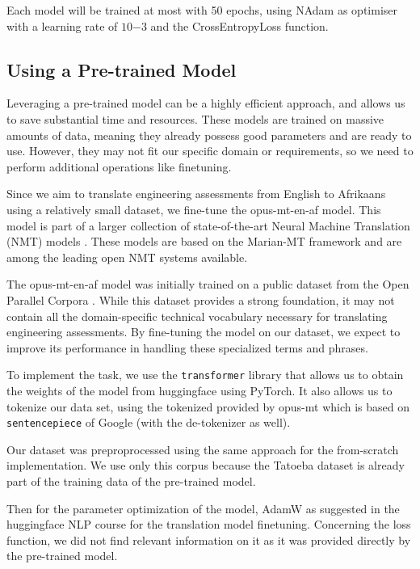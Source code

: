Each model will be trained at most with 50 epochs, using NAdam as optimiser with a learning rate of $10{-3}$ and the CrossEntropyLoss function. 


\subsection{Using a Pre-trained Model}
Leveraging a pre-trained model can be a highly efficient approach, and allows us to save substantial time and resources. These models are trained on massive amounts of data, meaning they already possess good parameters and are ready to use. However, they may not fit our specific domain or requirements, so we need to perform additional operations like finetuning. 

Since we aim to translate engineering assessments from English to Afrikaans using a relatively small dataset,  we fine-tune the opus-mt-en-af model. This model is part of a larger collection of state-of-the-art Neural Machine Translation (NMT) models \cite{OPUSMT}. These models are based on the Marian-MT framework \cite{marian} and are among the leading open NMT systems available.


The opus-mt-en-af model was initially trained on a public dataset from the Open Parallel Corpora \cite{opus}. While this dataset provides a strong foundation, it may not contain all the domain-specific technical vocabulary necessary for translating engineering assessments. By fine-tuning the model on our dataset, we expect to improve its performance in handling these specialized terms and phrases.


To implement the task, we use the \texttt{transformer} library that allows us to obtain the weights of the model from huggingface \cite{huggingface} using PyTorch. It also allows us to tokenize our data set, using the tokenized provided by opus-mt which is based on \texttt{sentencepiece} \cite{sentencepiece} of Google (with the de-tokenizer as well). 


Our dataset was preproprocessed using the same approach for the from-scratch implementation. We use only this corpus because the Tatoeba dataset is already part of the training data of the pre-trained model.

Then for the parameter optimization of the model, AdamW  \cite{AdamW} as suggested in the huggingface NLP course for the translation model finetuning. Concerning the loss function, we did not find relevant information on it as it was provided directly by the pre-trained model.


